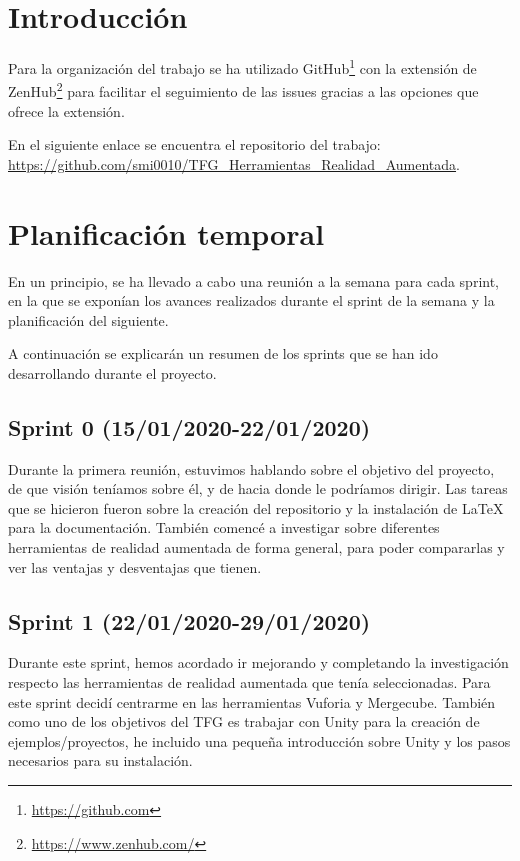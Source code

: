 
\section{Introducción}
 Para la organización del trabajo se ha utilizado GitHub\footnote{\url{https://github.com}} con la extensión de ZenHub\footnote{\url{https://www.zenhub.com/}} para facilitar el seguimiento de las issues gracias a las opciones que ofrece la extensión.
 
En el siguiente enlace se encuentra el repositorio del trabajo: \url{https://github.com/smi0010/TFG_Herramientas_Realidad_Aumentada}.
\section{Planificación temporal}

En un principio, se ha llevado a cabo una reunión a la semana para cada sprint, en la que se exponían los avances realizados durante el sprint de la semana y la planificación del siguiente.

A continuación se explicarán un resumen de los sprints que se han ido desarrollando durante el proyecto.

\subsection{Sprint 0 (15/01/2020-22/01/2020)}
Durante la primera reunión, estuvimos hablando sobre el objetivo del proyecto, de que visión teníamos sobre él, y de hacia donde le podríamos dirigir.
Las tareas que se hicieron fueron sobre la creación del repositorio y la instalación de \LaTeX{} para la documentación. También comencé a investigar sobre diferentes herramientas de realidad aumentada de forma general, para poder compararlas y ver las ventajas y desventajas que tienen.

\subsection{Sprint 1 (22/01/2020-29/01/2020)}
Durante este sprint, hemos acordado ir mejorando y completando  la investigación respecto las herramientas de realidad aumentada que tenía seleccionadas.
Para este sprint decidí centrarme en las herramientas Vuforia y Mergecube.
También como uno de los objetivos del TFG es trabajar con Unity para la creación de ejemplos/proyectos, he incluido una pequeña introducción sobre Unity y los pasos necesarios para su instalación.
